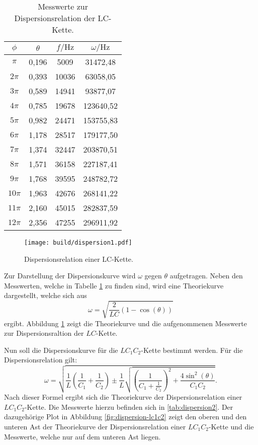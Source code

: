\begin{table}
  \centering
  \caption{Messwerte zur Dispersionsrelation der LC-Kette.}
  \label{tab:dispersion1}
  \begin{tabular}{c c c c}
    \toprule
    $\phi$ & $\theta$ & $f / \si{\hertz}$ & $\omega / \si{\hertz}$ \\
    \midrule
$\pi$ & 0,196 & 5009 & 31472,48 \\
$2\pi$ & 0,393 & 10036 & 63058,05 \\
$3\pi$ & 0,589 & 14941 & 93877,07 \\
$4\pi$ & 0,785 & 19678 & 123640,52 \\
$5\pi$ & 0,982 & 24471 & 153755,83 \\
$6\pi$ & 1,178 & 28517 & 179177,50 \\
$7\pi$ & 1,374 & 32447 & 203870,51 \\
$8\pi$ & 1,571 & 36158 & 227187,41 \\
$9\pi$ & 1,768 & 39595 & 248782,72 \\
$10\pi$ & 1,963 & 42676 & 268141,22 \\
$11\pi$ & 2,160 & 45015 & 282837,59 \\
$12\pi$ & 2,356 & 47255 & 296911,92 \\
\bottomrule
\end{tabular}
\end{table}

\begin{figure}
  \centering
  \texttt{[image: build/dispersion1.pdf]}
\caption{Dispersionsrelation einer LC-Kette.}
  \label{fig:dispersion-lc}
\end{figure}

Zur Darstellung der Dispersionskurve wird $\omega$ gegen $\theta$ aufgetragen. Neben den Messwerten, welche in Tabelle \ref{tab:dispersion1} zu finden sind, wird eine Theoriekurve dargestellt, welche sich aus
\begin{equation}
  \omega = \sqrt{\frac{2}{LC}(1-\cos(\theta))}
\end{equation}
 ergibt. Abbildung \ref{fig:dispersion-lc} zeigt die Theoriekurve und die aufgenommenen Messwerte zur Dispersionsraltion der $LC$-Kette.

 Nun soll die Dispersionskurve für die $LC_{1}C_{2}$-Kette bestimmt werden.
 Für die Dispersionsrelation gilt:
 \begin{equation}
  \omega = \sqrt{\frac{1}{L}\left(\frac{1}{C_{1}}+\frac{1}{C_{2}}\right)\pm\frac{1}{L}\sqrt{\left(\frac{1}{C_{1}+\frac{1}{C_2}}\right)^2 + \frac{4\sin^2(\theta)}{C_{1}C_{2}}}}.
  \end{equation}
  Nach dieser Formel ergibt sich die Theoriekurve der Dispersionsrelation einer $LC_{1}C_{2}$-Kette. Die Messwerte hierzu befinden sich in \ref{tab:dispersion2}. Der dazugehörige Plot in Abbildung \ref{fig:dispersion-lc1c2} zeigt den oberen und den unteren Ast der Theoriekurve der Dispersionsrelation einer $LC_{1}C_{2}$-Kette und die Messwerte, welche nur auf dem unteren Ast liegen.

